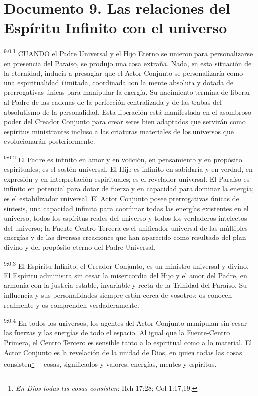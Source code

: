 \chapter{Documento 9. Las relaciones del Espíritu Infinito con el universo}
\par
\textsuperscript{9:0.1} CUANDO el Padre Universal y el Hijo Eterno se unieron para personalizarse en presencia del Paraíso, se produjo una cosa extraña. Nada, en esta situación de la eternidad, inducía a presagiar que el Actor Conjunto se personalizaría como una espiritualidad ilimitada, coordinada con la mente absoluta y dotada de prerrogativas únicas para manipular la energía. Su nacimiento termina de liberar al Padre de las cadenas de la perfección centralizada y de las trabas del absolutismo de la personalidad. Esta liberación está manifestada en el asombroso poder del Creador Conjunto para crear seres bien adaptados que servirán como espíritus ministrantes incluso a las criaturas materiales de los universos que evolucionarán posteriormente.

\par
\textsuperscript{9:0.2} El Padre es infinito en amor y en volición, en pensamiento y en propósito espirituales; es el sostén universal. El Hijo es infinito en sabiduría y en verdad, en expresión y en interpretación espirituales; es el revelador universal. El Paraíso es infinito en potencial para dotar de fuerza y en capacidad para dominar la energía; es el estabilizador universal. El Actor Conjunto posee prerrogativas únicas de síntesis, una capacidad infinita para coordinar todas las energías existentes en el universo, todos los espíritus reales del universo y todos los verdaderos intelectos del universo; la Fuente-Centro Tercera es el unificador universal de las múltiples energías y de las diversas creaciones que han aparecido como resultado del plan divino y del propósito eterno del Padre Universal.

\par
\textsuperscript{9:0.3} El Espíritu Infinito, el Creador Conjunto, es un ministro universal y divino. El Espíritu administra sin cesar la misericordia del Hijo y el amor del Padre, en armonía con la justicia estable, invariable y recta de la Trinidad del Paraíso. Su influencia y sus personalidades siempre están cerca de vosotros; os conocen realmente y os comprenden verdaderamente.

\par
\textsuperscript{9:0.4} En todos los universos, los agentes del Actor Conjunto manipulan sin cesar las fuerzas y las energías de todo el espacio. Al igual que la Fuente-Centro Primera, el Centro Tercero es sensible tanto a lo espiritual como a lo material. El Actor Conjunto es la revelación de la unidad de Dios, en quien todas las cosas consisten\footnote{\textit{En Dios todas las cosas consisten}: Hch 17:28; Col 1:17,19.} ---cosas, significados y valores; energías, mentes y espíritus.

